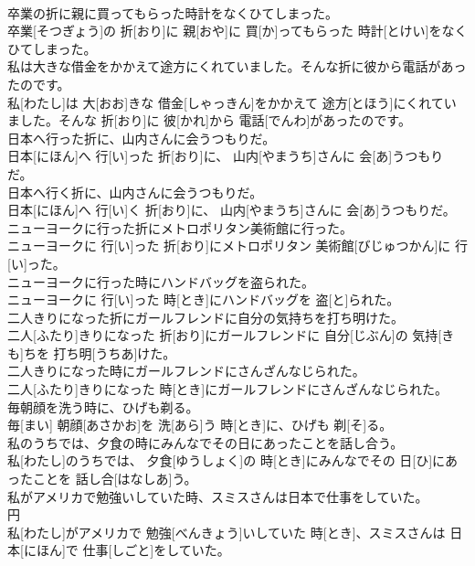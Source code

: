 \documentclass[8pt]{extreport}
\begin{document}
\begin{CJK}{UTF8}{min}
\\	卒業の折に親に買ってもらった時計をなくひてしまった。	
\\	卒業[そつぎょう]の 折[おり]に 親[おや]に 買[か]ってもらった 時計[とけい]をなくひてしまった。
\\	私は大きな借金をかかえて途方にくれていました。そんな折に彼から電話があったのです。	
\\	私[わたし]は 大[おお]きな 借金[しゃっきん]をかかえて 途方[とほう]にくれていました。そんな 折[おり]に 彼[かれ]から 電話[でんわ]があったのです。
\\	日本へ行った折に、山内さんに会うつもりだ。	
\\	日本[にほん]へ 行[い]った 折[おり]に、 山内[やまうち]さんに 会[あ]うつもりだ。
\\	日本へ行く折に、山内さんに会うつもりだ。	
\\	日本[にほん]へ 行[い]く 折[おり]に、 山内[やまうち]さんに 会[あ]うつもりだ。
\\	ニューヨークに行った折にメトロポリタン美術館に行った。	
\\	ニューヨークに 行[い]った 折[おり]にメトロポリタン 美術館[びじゅつかん]に 行[い]った。
\\	ニューヨークに行った時にハンドバッグを盗られた。	
\\	ニューヨークに 行[い]った 時[とき]にハンドバッグを 盗[と]られた。
\\	二人きりになった折にガールフレンドに自分の気持ちを打ち明けた。	
\\	二人[ふたり]きりになった 折[おり]にガールフレンドに 自分[じぶん]の 気持[きも]ちを 打ち明[うちあ]けた。
\\	二人きりになった時にガールフレンドにさんざんなじられた。	
\\	二人[ふたり]きりになった 時[とき]にガールフレンドにさんざんなじられた。
\\	毎朝顔を洗う時に、ひげも剃る。	
\\	毎[まい] 朝顔[あさかお]を 洗[あら]う 時[とき]に、ひげも 剃[そ]る。
\\	私のうちでは、夕食の時にみんなでその日にあったことを話し合う。	
\\	私[わたし]のうちでは、 夕食[ゆうしょく]の 時[とき]にみんなでその 日[ひ]にあったことを 話し合[はなしあ]う。
\\	私がアメリカで勉強いしていた時、スミスさんは日本で仕事をしていた。	
\\	円
\\	私[わたし]がアメリカで 勉強[べんきょう]いしていた 時[とき]、スミスさんは 日本[にほん]で 仕事[しごと]をしていた。

\end{CJK}
\end{document}
